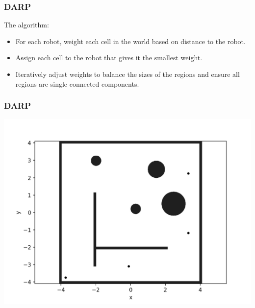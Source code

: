 \documentclass{beamer}
\begin{document}
	\begin{frame}
		\frametitle{DARP}
		The algorithm:
		\begin{itemize}
			\item<2-> For each robot, weight each cell in the world based on distance to the robot.
			\item<3-> Assign each cell to the robot that gives it the smallest weight.
			\item<4-> Iteratively adjust weights to balance the sizes of the regions and ensure all regions are single connected components.
		\end{itemize}
		
	\end{frame}
	
	\begin{frame}
		\frametitle{DARP}
		\includegraphics[width=\linewidth]{DARPImages/World_with_robots}
		
	\end{frame}
	
\end{document}
